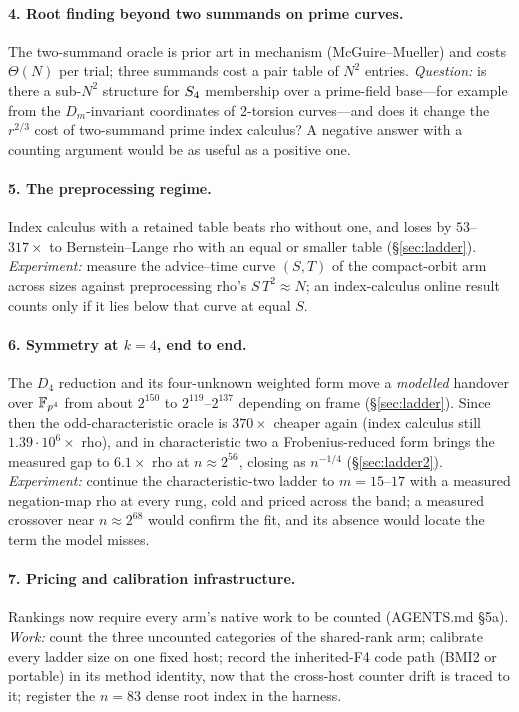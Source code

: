 \paragraph{4. Root finding beyond two summands on prime curves.} The
two-summand oracle is prior art in mechanism (McGuire--Mueller) and costs
$\Theta(N)$ per trial; three summands cost a pair table of $N^2$ entries.
\emph{Question:} is there a sub-$N^2$ structure for $S_{4}$ membership
over a prime-field base---for example from the $D_m$-invariant coordinates
of 2-torsion curves---and does it change the $r^{2/3}$ cost of two-summand
prime index calculus? A negative answer with a counting argument would be
as useful as a positive one.

\paragraph{5. The preprocessing regime.} Index calculus with a retained
table beats rho without one, and loses by $53$--$317\times$ to
Bernstein--Lange rho with an equal or smaller table (\S\ref{sec:ladder}).
\emph{Experiment:} measure the advice--time curve $(S,T)$ of the
compact-orbit arm across sizes against preprocessing rho's
$S\,T^2\approx N$; an index-calculus online result counts only if it lies
below that curve at equal $S$.

\paragraph{6. Symmetry at $k=4$, end to end.} The $D_4$ reduction and its
four-unknown weighted form move a \emph{modelled} handover over $\mathbb{F}_{p^4}$
from about $2^{150}$ to $2^{119}$--$2^{137}$ depending on frame
(\S\ref{sec:ladder}).
Since then the odd-characteristic oracle is $370\times$ cheaper again
(index calculus still $1.39\cdot10^6\times$ rho), and in characteristic two
a Frobenius-reduced form brings the measured gap to $6.1\times$ rho at
$n\approx2^{56}$, closing as $n^{-1/4}$ (\S\ref{sec:ladder2}).
\emph{Experiment:} continue the characteristic-two ladder to $m=15$--$17$
with a measured negation-map rho at every rung, cold and priced across the
band; a measured crossover near $n\approx2^{68}$ would confirm the fit, and
its absence would locate the term the model misses.

\paragraph{7. Pricing and calibration infrastructure.} Rankings now
require every arm's native work to be counted (AGENTS.md \S5a).
\emph{Work:} count the three uncounted categories of the shared-rank arm;
calibrate every ladder size on one fixed host; record the inherited-F4 code
path (BMI2 or portable) in its method identity, now that the cross-host
counter drift is traced to it; register the $n=83$ dense root index in the
harness.


